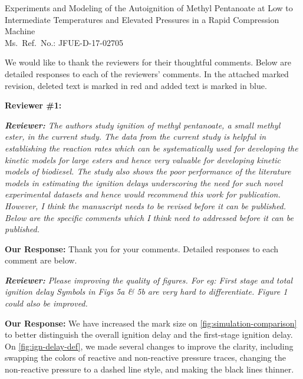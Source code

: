 \documentclass{article}
\newenvironment{reviewer}{\vspace{0.5\baselineskip}\begingroup\itshape\textbf{Reviewer:}}{\endgroup\vspace{0.5\baselineskip}}
\newenvironment{response}{\vspace{0.5\baselineskip}\textbf{Our Response:}}{\vspace{0.5\baselineskip}}
\begin{document}
\noindent Experiments and Modeling of the Autoignition of Methyl Pentanoate at Low to Intermediate Temperatures and Elevated Pressures in a Rapid Compression Machine \\
Ms.\ Ref.\ No.:  JFUE-D-17-02705

We would like to thank the reviewers for their thoughtful comments.
Below are detailed responses to each of the reviewers' comments.
In the attached marked revision, deleted text is marked in red and added text is marked in blue.

\vspace{\baselineskip}

\noindent \textbf{Reviewer \#1:}

\begin{reviewer}
%
    The authors study ignition of methyl pentanoate, a small methyl ester, in the current study. The
    data from the current study is helpful in establishing the reaction rates which can be
    systematically used for developing the kinetic models for large esters and hence very valuable
    for developing kinetic models of biodiesel. The study also shows the poor performance of the
    literature models in estimating the ignition delays underscoring the need for such novel
    experimental datasets and hence would recommend this work for publication. However, I think the
    manuscript needs to be revised before it can be published. Below are the specific comments which
    I think need to addressed before it can be published.
%
\end{reviewer}

\begin{response}
    Thank you for your comments. Detailed responses to each comment are below.
\end{response}

\begin{reviewer}
%
    Please improving the quality of figures. For eg: First stage and total ignition delay Symbols
    in Figs 5a \& 5b are very hard to differentiate. Figure 1 could also be improved.
%
\end{reviewer}

\begin{response}
    We have increased the mark size on \cref{fig:simulation-comparison} to better distinguish the
    overall ignition delay and the first-stage ignition delay. On \cref{fig:ign-delay-def}, we made
    several changes to improve the clarity, including swapping the colors of reactive and
    non-reactive pressure traces, changing the non-reactive pressure to a dashed line style, and
    making the black lines thinner.
\end{response}
\end{document}
